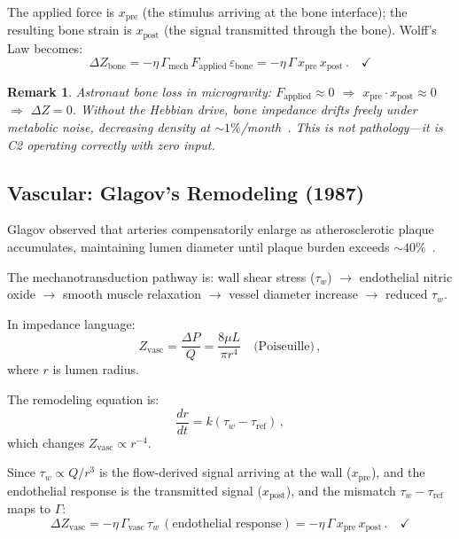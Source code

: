 \documentclass[aps,pre,twocolumn,superscriptaddress,floatfix]{revtex4-2}
\newtheorem{remark}{Remark}
\begin{document}
The applied force is $x_{\text{pre}}$ (the stimulus arriving
at the bone interface); the resulting bone strain is
$x_{\text{post}}$ (the signal transmitted through the bone).
Wolff's Law becomes:
\begin{equation}
  \Delta Z_{\text{bone}}
  = -\eta\,\Gamma_{\text{mech}}\,
    F_{\text{applied}}\,\varepsilon_{\text{bone}}
  = -\eta\,\Gamma\,x_{\text{pre}}\,x_{\text{post}}\,.
  \quad \checkmark
  \label{eq:wolff-C2}
\end{equation}

\begin{remark}
Astronaut bone loss in microgravity:
$F_{\text{applied}} \approx 0$ $\Rightarrow$
$x_{\text{pre}} \cdot x_{\text{post}} \approx 0$ $\Rightarrow$
$\Delta Z = 0$.
Without the Hebbian drive, bone impedance drifts freely
under metabolic noise, decreasing density at
${\sim}1\%$/month~\cite{Lang2004}.
This is not pathology---it is C2 operating correctly
with zero input.
\end{remark}


\subsection{Vascular: Glagov's Remodeling (1987)}
\label{sec:glagov}

Glagov observed that arteries compensatorily enlarge
as atherosclerotic plaque accumulates, maintaining
lumen diameter until plaque burden exceeds
${\sim}40\%$~\cite{Glagov1987}.

The mechanotransduction pathway is:
wall shear stress ($\tau_w$) $\to$ endothelial
nitric oxide $\to$ smooth muscle relaxation $\to$
vessel diameter increase $\to$ reduced $\tau_w$.

In impedance language:
\begin{equation}
  Z_{\text{vasc}} = \frac{\Delta P}{Q}
  = \frac{8\mu L}{\pi r^4}
  \quad \text{(Poiseuille)}\,,
\end{equation}
where $r$ is lumen radius.

The remodeling equation is:
\begin{equation}
  \frac{dr}{dt} = k(\tau_w - \tau_{\text{ref}})\,,
  \label{eq:glagov-shear}
\end{equation}
which changes $Z_{\text{vasc}} \propto r^{-4}$.

Since $\tau_w \propto Q/r^3$ is the flow-derived signal
arriving at the wall ($x_{\text{pre}}$), and the
endothelial response is the transmitted signal
($x_{\text{post}}$), and the mismatch
$\tau_w - \tau_{\text{ref}}$ maps to $\Gamma$:
\begin{equation}
  \Delta Z_{\text{vasc}}
  = -\eta\,\Gamma_{\text{vasc}}\,
    \tau_w\,(\text{endothelial response})
  = -\eta\,\Gamma\,x_{\text{pre}}\,x_{\text{post}}\,.
  \quad \checkmark
  \label{eq:glagov-C2}
\end{equation}
\end{document}
